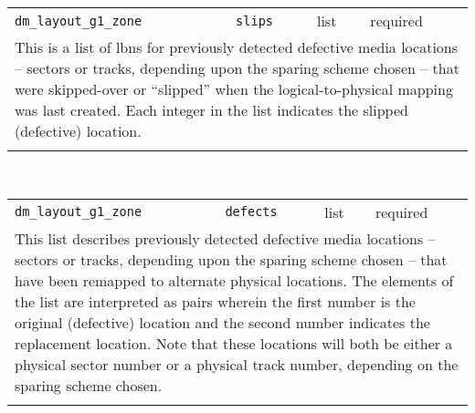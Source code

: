 \noindent 
\begin{tabular}{|p{1.5in}|p{3.5in}|p{0.5in}|p{0.5in}|}
\cline{1-4}
\texttt{dm\_layout\_g1\_zone} & \texttt{slips} & list & required \\ 
\cline{1-4}
\multicolumn{4}{|p{6in}|}{
This is a list of lbns for previously detected defective media
locations -- sectors or tracks, depending upon the sparing scheme
chosen -- that were skipped-over or ``slipped'' when the
logical-to-physical mapping was last created. Each integer in the
list indicates the slipped (defective) location.
}\\ 
\cline{1-4}
\multicolumn{4}{p{5in}}{}\\
\end{tabular}\\ 
\noindent 
\begin{tabular}{|p{1.5in}|p{3.5in}|p{0.5in}|p{0.5in}|}
\cline{1-4}
\texttt{dm\_layout\_g1\_zone} & \texttt{defects} & list & required \\ 
\cline{1-4}
\multicolumn{4}{|p{6in}|}{
This list describes previously detected defective media
locations -- sectors or tracks, depending upon the sparing scheme
chosen -- that have been remapped to alternate physical locations.
The elements of the list are interpreted as pairs wherein the first
number is the original (defective) location and the second number
indicates the replacement location. Note that these locations
will both be either a physical sector number or a physical track
number, depending on the sparing scheme chosen.
}\\ 
\cline{1-4}
\multicolumn{4}{p{5in}}{}\\
\end{tabular}\\ 
